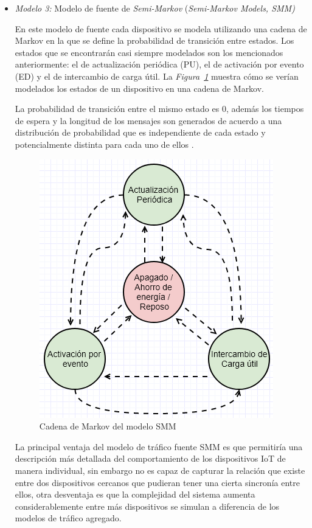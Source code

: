 \begin{itemize}
\item  \textit{Modelo 3:} Modelo de fuente de \textit{Semi-Markov} (\textit{Semi-Markov Models, SMM)}

En este modelo de fuente cada dispositivo se modela utilizando una cadena de Markov en la que se define la probabilidad de transición entre estados. Los estados que se encontrarán casi siempre modelados son los mencionados anteriormente: el de actualización periódica (PU), el de activación por evento (ED) y el de intercambio de carga útil. La \textit{Figura~\ref{fig:SMM}} muestra cómo se verían modelados los estados de un dispositivo en una cadena de Markov.\newline

La probabilidad de transición entre el mismo estado es 0, además los tiempos de espera y la longitud de los mensajes son generados de acuerdo a una distribución de probabilidad que es independiente de cada estado y potencialmente distinta para cada uno de ellos \parencite{IoTTrafficHossfeld}.\newline

\begin{figure}[th]
\centering
\includegraphics[scale=1]{Figures/Cadena de Markov del modelo SMM}
\decoRule
\caption[Cadena de Markov del modelo SMM]{Cadena de Markov del modelo SMM}
\label{fig:SMM}
\end{figure}

La principal ventaja del modelo de tráfico fuente SMM es que permitiría una descripción más detallada del comportamiento de los dispositivos IoT de manera individual, sin embargo no es capaz de capturar la relación que existe entre dos dispositivos cercanos que pudieran tener una cierta sincronía entre ellos, otra desventaja es que la complejidad del sistema aumenta considerablemente entre más dispositivos se simulan a diferencia de los modelos de tráfico agregado.


\end{itemize}
